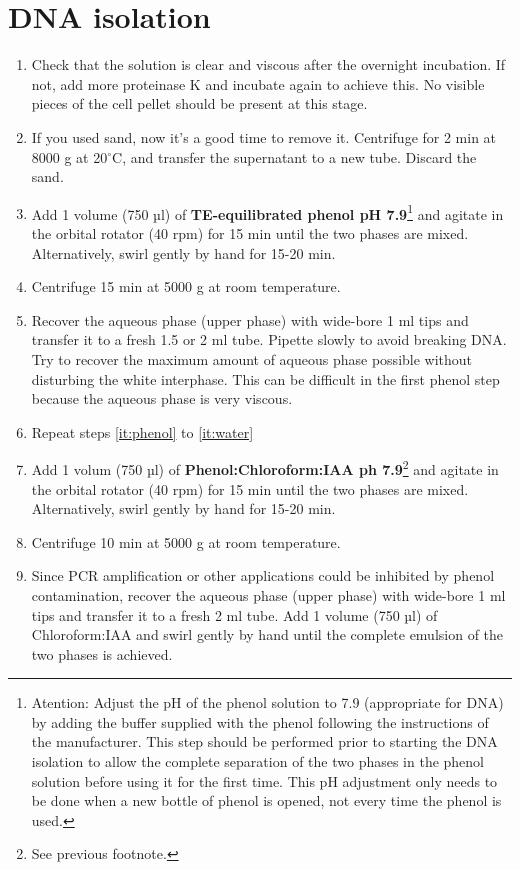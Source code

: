 \documentclass{article}
\begin{document}
\section{DNA isolation}
\begin{enumerate}
   \item Check that the solution is clear and viscous after the overnight incubation. If not, add more proteinase K and incubate again to achieve this. No visible pieces of the cell pellet should be present at this stage.
   \item If you used sand, now it's a good time to remove it. Centrifuge for 2 min at 8000 g at 20$^\circ{}$C, and transfer the supernatant to a new tube. Discard the sand.
   \item Add 1 volume (750 µl) of \textbf{TE-equilibrated phenol pH 7.9}\footnote{Atention: Adjust the pH of the phenol solution to 7.9 (appropriate for DNA) by adding the buffer supplied with the phenol following the instructions of the manufacturer. This step should be performed prior to starting the DNA isolation to allow the complete separation of the two phases in the phenol solution before using it for the first time. This pH adjustment only needs to be done when a new bottle of phenol is opened, not every time the phenol is used.} and agitate in the orbital rotator (40 rpm) for 15 min until the two phases are mixed. Alternatively, swirl gently by hand for 15-20 min.\label{it:phenol}
   \item Centrifuge 15 min at 5000 g at room temperature.
   \item Recover the aqueous phase (upper phase) with wide-bore 1 ml tips and transfer it to a fresh 1.5 or 2 ml tube. Pipette slowly to avoid breaking DNA. Try to recover the maximum amount of aqueous phase possible without disturbing the white interphase. This can be difficult in the first phenol step because the aqueous phase is very viscous.\label{it:water}
   \item Repeat steps \ref{it:phenol} to \ref{it:water}
   \item Add 1 volum (750 µl) of \textbf{Phenol:Chloroform:IAA ph 7.9}\footnote{See previous footnote.} and agitate in the orbital rotator (40 rpm) for 15 min until the two phases are mixed. Alternatively, swirl gently by hand for 15-20 min.
   \item Centrifuge 10 min at 5000 g at room temperature.
   \item Since PCR amplification or other applications could be inhibited by phenol contamination, recover the aqueous phase (upper phase) with wide-bore 1 ml tips and transfer it to a fresh 2 ml tube. Add 1 volume (750 µl) of Chloroform:IAA and swirl gently by hand until the complete emulsion of the two phases is achieved.

\end{enumerate}
\end{document}
